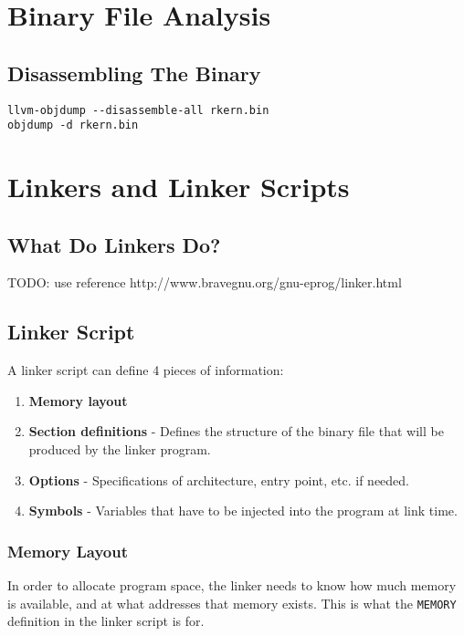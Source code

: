 \documentclass[a4paper,12pt,twoside]{report}
\begin{document}
    \chapter{Binary File Analysis}

        \section{Disassembling The Binary}

            \begin{verbatim}
llvm-objdump --disassemble-all rkern.bin
objdump -d rkern.bin
            \end{verbatim}

    \chapter{Linkers and Linker Scripts}

        \section{What Do Linkers Do?}
            TODO: use reference http://www.bravegnu.org/gnu-eprog/linker.html

        \section{Linker Script}
            A linker script can define 4 pieces of information:
            \begin{enumerate}
            	\item \textbf{Memory layout}
            	\item \textbf{Section definitions} - Defines the structure of the binary file that will be produced by the linker program.
            	\item \textbf{Options} - Specifications of architecture, entry point, etc. if needed.
            	\item \textbf{Symbols} - Variables that have to be injected into the program at link time.
            \end{enumerate}\cite{memfaultLinkerScripts}

            \subsection{Memory Layout}
                In order to allocate program space, the linker needs to know how much memory is available, and at what addresses that memory exists. This is what the \verb|MEMORY| definition in the linker script is for.
\end{document}
